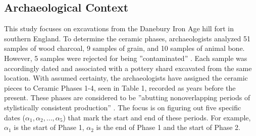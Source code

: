 \documentclass{article}
\begin{document}
\subsection{Archaeological Context}
This study focuses on excavations from the Danebury Iron Age hill fort in southern England. To determine the ceramic phases, archaeologists analyzed 51 samples of wood charcoal, 9 samples of grain, and 10 samples of animal bone. However, 5 samples were rejected for being ''contaminated'' \cite{thepaper}. Each sample was accordingly dated and associated with a pottery shard excavated from the same location. With assumed certainty, the archaeologists have assigned the ceramic pieces to Ceramic Phases 1-4, seen in Table 1, recorded as years before the present. These phases are considered to be ''abutting nonoverlapping periods of stylistically consistent production'' \cite{thepaper}. The focus is on figuring out five specific dates ($\alpha_1, \alpha_2, ..., \alpha_5$) that mark the start and end of these periods. For example, $\alpha_1$ is the start of Phase 1, $\alpha_2$ is the end of Phase 1 and the start of Phase 2.
\end{document}
